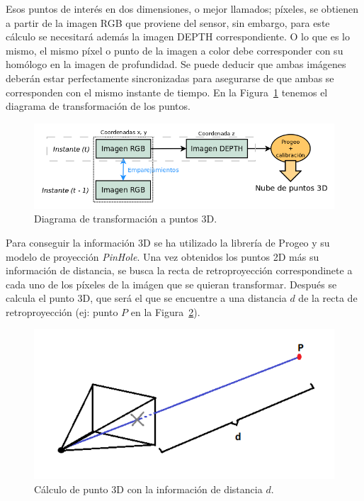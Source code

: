 Esos puntos de interés en dos dimensiones, o mejor llamados; píxeles, se obtienen a partir de la imagen RGB que proviene del sensor, sin embargo, para este cálculo se necesitará además la imagen DEPTH correspondiente. O lo que es lo mismo, el mismo píxel o punto de la imagen a color debe corresponder con su homólogo en la imagen de profundidad. Se puede deducir que ambas imágenes deberán estar perfectamente sincronizadas para asegurarse de que ambas se corresponden con el mismo instante de tiempo. En la Figura~\ref{fig:diagramPoints3d} tenemos el diagrama de transformación de los puntos.

\begin{figure}[th]
\centering
\includegraphics[scale=0.4]{Figures/diagram-points-3d.png}
\decoRule
\caption[Diagrama con la obtención de puntos 3D]{Diagrama de transformación a puntos 3D.}
\label{fig:diagramPoints3d}
\end{figure}

Para conseguir la información 3D se ha utilizado la librería de Progeo y su modelo de proyección \textit{PinHole}. Una vez obtenidos los puntos 2D más su información de distancia, se busca la recta de retroproyección correspondinete a cada uno de los píxeles de la imágen que se quieran transformar. Después se calcula el punto 3D, que será el que se encuentre a una distancia $d$ de la recta de retroproyección (ej: punto $P$ en la Figura~\ref{fig:camLine}).

\begin{figure}[th]
\centering
\includegraphics[scale=0.35]{Figures/cam-line.png}
\decoRule
\caption[cam-line]{Cálculo de punto 3D con la información de distancia $d$.}
\label{fig:camLine}
\end{figure}

